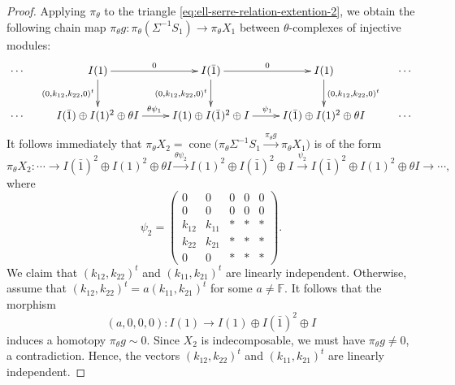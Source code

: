 \documentclass[12pt,reqno]{amsart}
\numberwithin{equation}{section}
\newcommand{\cone}{\operatorname{cone}\nolimits}
\begin{document}
\begin{proof}
		Applying $\pi_\theta$ to the triangle \eqref{eq:ell-serre-relation-extention-2}, we obtain the following chain map $\pi_\theta g: \pi_\theta (\Sigma^{-1}S_1)\rightarrow \pi_\theta X_1$ between $\theta$-complexes of injective modules:
		\[
		\xymatrix{ 
			\cdots &
			{I(1)}\ar[d]_{(0,k_{12},k_{22},0)^t}\ar[r]^0 &  {I(\bar 1)} \ar[d]_{(0,k_{12},k_{22},0)^t}\ar[r]^0& {I(1)}\ar[d]^{(0,k_{12},k_{22},0)^t} & \cdots \\
			\cdots & 
			{I(\bar 1)\oplus I(1)^2\oplus \theta I} 
			\ar[r]^{
				\theta \psi_{1}
			} 
			& I(1) \oplus  I(\bar 1)^2\oplus  I\ar[r]^{ \psi_1} &{I(\bar 1) \oplus I(1)^2\oplus \theta I} & \cdots
		}
		\]
		It follows immediately that
		$\pi_\theta X_2
		=\cone\bigl(\pi_\theta\Sigma^{-1}S_1\xrightarrow{\, \pi_\theta g \,} \pi_\theta X_1\bigr)$
		is of the form 
		\[
		\pi_{\theta}X_2:
		\cdots \longrightarrow
		I(\bar 1)^2\oplus I(1)^2\oplus \theta I
		\xrightarrow{\theta \psi_2}
		I(1)^2\oplus I(\bar 1)^2\oplus  I
		\xrightarrow{\psi_2}
		I(\bar 1)^2\oplus I(1)^2\oplus \theta I
		\longrightarrow \cdots,
		\]
		where 
		\[
		\psi_2 =\begin{pmatrix}
			0 & 0 & 0 & 0 & 0\\
			0 & 0 & 0 & 0 & 0\\
			k_{12} & k_{11} & * & * & * \\
			k_{22} & k_{21} & * & * & * \\
			0 & 0 & * & * & *
		\end{pmatrix}.
		\]
		We claim that $(k_{12},k_{22})^t$ and $(k_{11},k_{21})^t$ are linearly independent. Otherwise,
		assume that
		$(k_{12},k_{22})^t=a(k_{11},k_{21})^t$ for some $a\neq \mathbb{F}$. It follows that
		the morphism
		\[
		(a,0,0,0): I(1)\longrightarrow I(1)\oplus I(\bar 1)^2\oplus I
		\]
		induces a homotopy $\pi_\theta g\sim 0$. Since $X_2$ is indecomposable, we must have $\pi_\theta g\neq 0$, a contradiction. Hence, the vectors $(k_{12},k_{22})^t$ and $(k_{11},k_{21})^t$ are linearly independent.
		
		
		
		

\end{proof}
\end{document}
